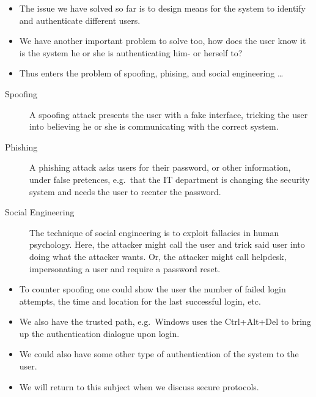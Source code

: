 \documentclass{beamer}
\begin{document}
\begin{frame}
  \begin{itemize}
    \item The issue we have solved so far is to design means for the system to 
      identify and authenticate different users.

    \item We have another important problem to solve too, how does the user 
      know it is the system he or she is authenticating him- or herself to?

    \item Thus enters the problem of spoofing, phising, and social engineering 
      \dots
  \end{itemize}
\end{frame}

\begin{frame}
  \begin{description}
    \item[Spoofing] A spoofing attack presents the user with a fake interface, 
      tricking the user into believing he or she is communicating with the 
      correct system.

    \item[Phishing] A phishing attack asks users for their password, or other 
      information, under false pretences, e.g.\ that the IT department is 
      changing the security system and needs the user to reenter the password.

    \item[Social Engineering] The technique of social engineering is to exploit 
      fallacies in human psychology.
      Here, the attacker might call the user and trick said user into doing 
      what the attacker wants.
      Or, the attacker might call helpdesk, impersonating a user and require 
      a password reset.
  \end{description}
\end{frame}

\begin{frame}
  \begin{itemize}
    \item To counter spoofing one could show the user the number of failed 
      login attempts, the time and location for the last successful login, etc.

    \item We also have the trusted path, e.g.\ Windows uses the Ctrl+Alt+Del to 
      bring up the authentication dialogue upon login.

    \item We could also have some other type of authentication of the system to 
      the user.

    \item We will return to this subject when we discuss secure protocols.

  \end{itemize}
\end{frame}
\end{document}
